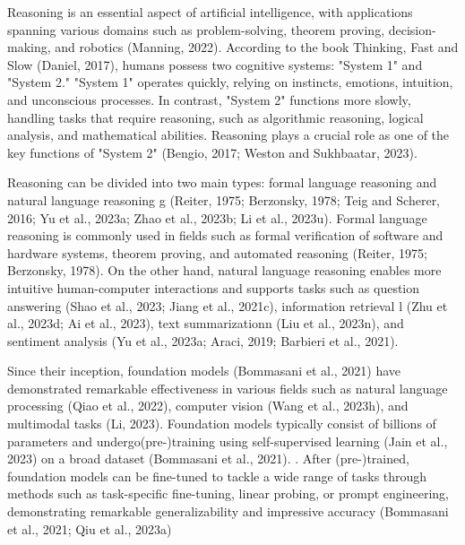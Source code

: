 Reasoning is an essential aspect of artificial intelligence, with applications 
spanning various domains such as problem-solving, theorem proving, 
decision-making, and robotics (Manning, 2022). According to the book Thinking, 
Fast and Slow (Daniel, 2017), humans possess two cognitive systems: "System 1" 
and "System 2." "System 1" operates quickly, relying on instincts, emotions, 
intuition, and unconscious processes. In contrast, "System 2" functions more 
slowly, handling tasks that require reasoning, such as algorithmic reasoning, 
logical analysis, and mathematical abilities. Reasoning plays a crucial role 
as one of the key functions of "System 2" (Bengio, 2017; Weston and Sukhbaatar, 
2023). 

Reasoning can be divided into two main types: formal language reasoning and 
natural language reasoning g (Reiter, 1975; Berzonsky, 1978; Teig and Scherer, 
2016; Yu et al., 2023a; Zhao et al., 2023b; Li et al., 2023u). Formal language 
reasoning is commonly used in fields such as formal verification of software and hardware 
systems, theorem proving, and automated reasoning (Reiter, 1975; Berzonsky, 1978). 
On the other hand, natural language reasoning enables more intuitive human-computer 
interactions and supports tasks such as question answering (Shao et al., 2023;
Jiang et al., 2021c), information retrieval l (Zhu et al., 2023d; Ai et al., 2023), text 
summarizationn (Liu et al., 2023n), and sentiment analysis (Yu et al., 2023a; Araci, 2019;
Barbieri et al., 2021).

Since their inception, foundation models (Bommasani et al., 2021)  have demonstrated 
remarkable effectiveness in various fields such as natural language processing 
(Qiao et al., 2022), computer vision (Wang et al., 2023h), and multimodal tasks  
(Li, 2023). Foundation models typically consist of billions of parameters and 
undergo(pre-)training using self-supervised learning (Jain et al., 2023) on a 
broad dataset (Bommasani et al., 2021). . After (pre-)trained, foundation models 
can be fine-tuned to tackle a wide range of tasks through methods such as task-specific 
fine-tuning, linear probing, or prompt engineering, demonstrating remarkable 
generalizability and impressive accuracy (Bommasani et al., 2021; Qiu et al., 2023a)

